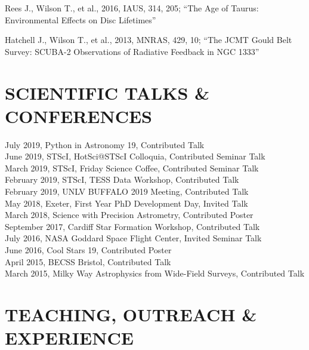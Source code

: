 \documentclass[letter, margin, 10pt]{res} %
\begin{document}
\begin{resume}
Rees J., Wilson T., et al., 2016, IAUS, 314, 205; ``The Age of Taurus: Environmental Effects on Disc Lifetimes''

Hatchell J., Wilson T., et al., 2013, MNRAS, 429, 10; ``The JCMT Gould Belt Survey: SCUBA-2 Observations of Radiative Feedback in NGC 1333''


\parskip \baselineskip
\vspace{-5pt}
\section{SCIENTIFIC TALKS \& CONFERENCES}

July 2019, Python in Astronomy 19, Contributed Talk\\
June 2019, STScI, HotSci@STScI Colloquia, Contributed Seminar Talk\\
March 2019, STScI, Friday Science Coffee, Contributed Seminar Talk\\
February 2019, STScI, TESS Data Workshop, Contributed Talk\\
February 2019, UNLV BUFFALO 2019 Meeting, Contributed Talk\\
May 2018, Exeter, First Year PhD Development Day, Invited Talk\\
March 2018, Science with Precision Astrometry, Contributed Poster\\
September 2017, Cardiff Star Formation Workshop, Contributed Talk\\
July 2016, NASA Goddard Space Flight Center, Invited Seminar Talk\\
June 2016, Cool Stars 19, Contributed Poster\\
April 2015, BECSS Bristol, Contributed Talk\\
March 2015, Milky Way Astrophysics from Wide-Field Surveys, Contributed Talk

 \vspace{-5pt}
\section{TEACHING, OUTREACH \& EXPERIENCE}


\end{resume}
\end{document}
